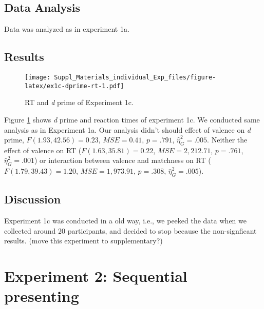 \documentclass[
  english,
  man]{apa6}
\begin{document}
\hypertarget{data-analysis-2}{%
\subsection{Data Analysis}\label{data-analysis-2}}

Data was analyzed as in experiment 1a.

\hypertarget{results-2}{%
\subsection{Results}\label{results-2}}

\begin{figure}
\centering
\texttt{[image: Suppl\_Materials\_individual\_Exp\_files/figure-latex/ex1c-dprime-rt-1.pdf]}
\caption{\label{fig:ex1c-dprime-rt}RT and \emph{d} prime of Experiment 1c.}
\end{figure}

Figure \ref{fig:ex1c-dprime-rt} shows \emph{d} prime and reaction times of experiment 1c. We conducted same analysis as in Experiment 1a. Our analysis didn't should effect of valence on \emph{d} prime, \(F(1.93, 42.56) = 0.23\), \(\mathit{MSE} = 0.41\), \(p = .791\), \(\hat{\eta}^2_G = .005\). Neither the effect of valence on RT (\(F(1.63, 35.81) = 0.22\), \(\mathit{MSE} = 2,212.71\), \(p = .761\), \(\hat{\eta}^2_G = .001\)) or interaction between valence and matchness on RT (\(F(1.79, 39.43) = 1.20\), \(\mathit{MSE} = 1,973.91\), \(p = .308\), \(\hat{\eta}^2_G = .005\)).

\hypertarget{discussion-1}{%
\subsection{Discussion}\label{discussion-1}}

Experiment 1c was conducted in a old way, i.e., we peeked the data when we collected around 20 participants, and decided to stop because the non-signficant results. (move this experiment to supplementary?)

\hypertarget{experiment-2-sequential-presenting}{%
\section{Experiment 2: Sequential presenting}\label{experiment-2-sequential-presenting}}
\end{document}
